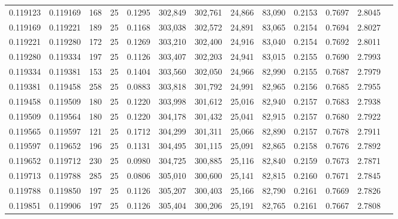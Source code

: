 \begin{tabular}{rrrrrrrrrrrrr}
0.119123 & 0.119169 &   168 &  25 &                                     0.1295 & 302,849 & 302,761 &  24,866 &  83,090 & 0.2153 & 0.7697 & 2.8045 \\
0.119169 & 0.119221 &   189 &  25 &                                     0.1168 & 303,038 & 302,572 &  24,891 &  83,065 & 0.2154 & 0.7694 & 2.8027 \\
0.119221 & 0.119280 &   172 &  25 &                                     0.1269 & 303,210 & 302,400 &  24,916 &  83,040 & 0.2154 & 0.7692 & 2.8011 \\
0.119280 & 0.119334 &   197 &  25 &                                     0.1126 & 303,407 & 302,203 &  24,941 &  83,015 & 0.2155 & 0.7690 & 2.7993 \\
0.119334 & 0.119381 &   153 &  25 &                                     0.1404 & 303,560 & 302,050 &  24,966 &  82,990 & 0.2155 & 0.7687 & 2.7979 \\
0.119381 & 0.119458 &   258 &  25 &                                     0.0883 & 303,818 & 301,792 &  24,991 &  82,965 & 0.2156 & 0.7685 & 2.7955 \\
0.119458 & 0.119509 &   180 &  25 &                                     0.1220 & 303,998 & 301,612 &  25,016 &  82,940 & 0.2157 & 0.7683 & 2.7938 \\
0.119509 & 0.119564 &   180 &  25 &                                     0.1220 & 304,178 & 301,432 &  25,041 &  82,915 & 0.2157 & 0.7680 & 2.7922 \\
0.119565 & 0.119597 &   121 &  25 &                                     0.1712 & 304,299 & 301,311 &  25,066 &  82,890 & 0.2157 & 0.7678 & 2.7911 \\
0.119597 & 0.119652 &   196 &  25 &                                     0.1131 & 304,495 & 301,115 &  25,091 &  82,865 & 0.2158 & 0.7676 & 2.7892 \\
0.119652 & 0.119712 &   230 &  25 &                                     0.0980 & 304,725 & 300,885 &  25,116 &  82,840 & 0.2159 & 0.7673 & 2.7871 \\
0.119713 & 0.119788 &   285 &  25 &                                     0.0806 & 305,010 & 300,600 &  25,141 &  82,815 & 0.2160 & 0.7671 & 2.7845 \\
0.119788 & 0.119850 &   197 &  25 &                                     0.1126 & 305,207 & 300,403 &  25,166 &  82,790 & 0.2161 & 0.7669 & 2.7826 \\
0.119851 & 0.119906 &   197 &  25 &                                     0.1126 & 305,404 & 300,206 &  25,191 &  82,765 & 0.2161 & 0.7667 & 2.7808 \\

\end{tabular}
